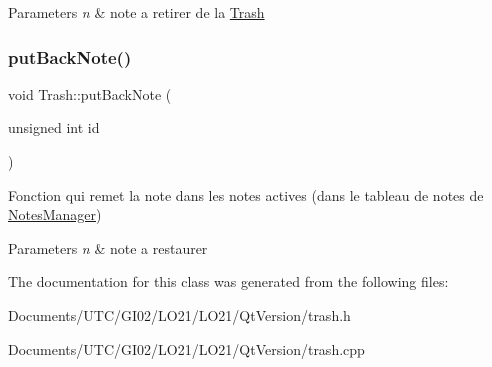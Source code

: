 \begin{DoxyParams}{Parameters}
{\em n} & note a retirer de la \hyperlink{class_trash}{Trash} \\
\hline
\end{DoxyParams}
\mbox{\label{class_trash_aab5b97637ce7706c0818261bfbdcbd05}} 
\subsubsection{\texorpdfstring{put\+Back\+Note()}{putBackNote()}}
{\footnotesize\ttfamily void Trash\+::put\+Back\+Note (\begin{DoxyParamCaption}\item[{unsigned int}]{id }\end{DoxyParamCaption})}



Fonction qui remet la note dans les notes actives (dans le tableau de notes de \hyperlink{class_notes_manager}{Notes\+Manager}) 


\begin{DoxyParams}{Parameters}
{\em n} & note a restaurer \\
\hline
\end{DoxyParams}


The documentation for this class was generated from the following files\+:\begin{DoxyCompactItemize}
\item 
Documents/\+U\+T\+C/\+G\+I02/\+L\+O21/\+L\+O21/\+Qt\+Version/trash.\+h\item 
Documents/\+U\+T\+C/\+G\+I02/\+L\+O21/\+L\+O21/\+Qt\+Version/trash.\+cpp\end{DoxyCompactItemize}
